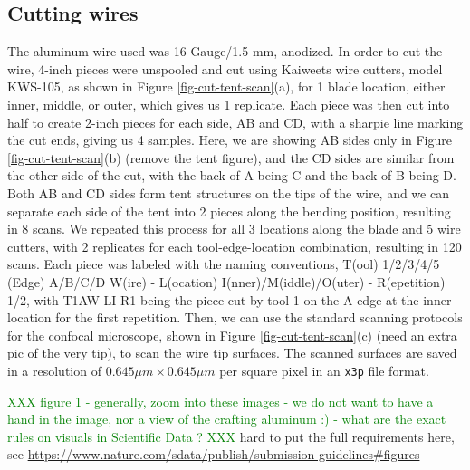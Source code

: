 \documentclass[fleqn,10pt]{wlscirep}
\newcommand{\tom}[1]{{\textcolor{RedOrange}{#1}}}
\newcommand{\hh}[1]{{\textcolor{Green}{#1}}}
\begin{document}
\subsection{Cutting wires}\label{sec-cutting-wires}

The aluminum wire used was 16 Gauge/1.5 mm, anodized. In order to cut
the wire, 4-inch pieces were unspooled and cut using Kaiweets wire
cutters, model KWS-105, as shown in Figure \ref{fig-cut-tent-scan}(a),
for 1 blade location, either inner, middle, or outer, which gives us 1
replicate. Each piece was then cut into half to create 2-inch pieces for
each side, AB and CD, with a sharpie line marking the cut ends, giving
us 4 samples. Here, we are showing AB sides only in Figure
\ref{fig-cut-tent-scan}(b) \tom{(remove the tent figure)}, and the CD
sides are similar from the other side of the cut, with the back of A
being C and the back of B being D. Both AB and CD sides form tent
structures on the tips of the wire, and we can separate each side of the
tent into 2 pieces along the bending position, resulting in 8 scans. We
repeated this process for all 3 locations along the blade and 5 wire
cutters, with 2 replicates for each tool-edge-location combination,
resulting in 120 scans. Each piece was labeled with the naming
conventions, T(ool) 1/2/3/4/5 (Edge) A/B/C/D W(ire) - L(ocation)
I(nner)/M(iddle)/O(uter) - R(epetition) 1/2, with T1AW-LI-R1 being the
piece cut by tool 1 on the A edge at the inner location for the first
repetition. Then, we can use the standard scanning protocols for the
confocal microscope, shown in Figure \ref{fig-cut-tent-scan}(c)
\tom{(need an extra pic of the very tip)}, to scan the wire tip
surfaces. The scanned surfaces are saved in a resolution of
\(0.645 \mu m \times 0.645 \mu m\) per square pixel in an \texttt{x3p}
file format.

\hh{XXX figure 1 - generally, zoom into these images - we do not want to have a hand in the image, nor a view of the crafting aluminum :)  - what are the exact rules on visuals in Scientific Data ? XXX}
\tom{hard to put the full requirements here, see \href{https://www.nature.com/sdata/publish/submission-guidelines\#figures}{https://www.nature.com/sdata/publish/submission-guidelines\#figures}}
\end{document}
